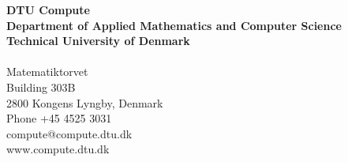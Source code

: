 \thispagestyle{empty} %
\frieze
\vspace*{\fill}
\noindent
\sffamily
\scriptsize
\textbf{DTU Compute}\\
\textbf{Department of Applied Mathematics and Computer Science}\\
\textbf{Technical University of Denmark}\\
\\
Matematiktorvet\\
Building 303B\\
2800 Kongens Lyngby, Denmark\\
Phone +45 4525 3031\\
compute@compute.dtu.dk\\
www.compute.dtu.dk\\
\normalsize
\normalfont
\vspace*{2.5cm}
